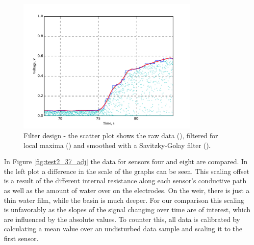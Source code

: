 \begin{figure}[H]
	\begin{center}
		\includegraphics[width=0.8\textwidth]{images/log080716_2_7_scatter.pdf} 
		\caption{Filter design - the scatter plot shows the raw data (\drawline[cyan]), filtered for local maxima (\drawline[blue]) and smoothed with a Savitzky-Golay filter (\drawline[red]).}
		\label{fig:test2_7_scatter}
	\end{center}
\end{figure}

In Figure \ref{fig:test2_37_adj} the data for sensors four and eight are compared. In the left plot a difference in the scale of the graphs can be seen. This scaling offset is a result of the different internal resistance along each sensor's conductive path as well as the amount of  water over on the electrodes. On the weir, there is just a thin water film, while the basin is much deeper. For our comparison this scaling is unfavorably as the slopes of the signal changing over time are of interest, which are influenced by the absolute values. To counter this, all data is calibrated by calculating a mean value over an undisturbed data sample and scaling it to the first sensor.

